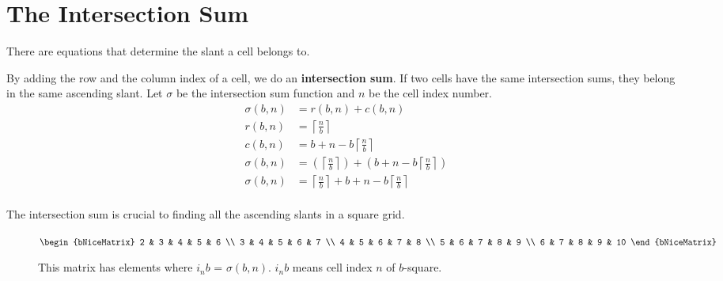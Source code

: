 \documentclass[letterpaper, twoside,12pt]{book}
\begin{document}
    \section{The Intersection Sum} \label{intersection_sum}
    There are equations that determine the slant a cell belongs to.

    By adding the row and the column index of a cell, we do an \textbf{intersection sum}. If two cells have the same intersection sums, they belong in the same ascending slant. Let $\sigma$ be the intersection sum function and $n$ be the cell index number.
    \begin{equation}
        \begin{split}
            \sigma(b,n) &= r(b,n) + c(b,n) \\
            r(b,n) &= \left\lceil \frac{n}{b} \right\rceil \\
            c(b,n) &= b + n - b\left\lceil \frac{n}{b} \right\rceil \\
            \sigma(b,n) &= ( \left\lceil \frac{n}{b} \right\rceil ) + (b + n - b\left\lceil \frac{n}{b} \right\rceil)\\
            \sigma(b,n) &= \left\lceil \frac{n}{b} \right\rceil + b + n - b\left\lceil \frac{n}{b} \right\rceil\\
        \end{split}
    \end{equation}

    The intersection sum is crucial to finding all the ascending slants in a square grid.
    \begin{figure}[ht]
        \centering
        {$
        \begin{bNiceMatrix}
            2 & 3 & 4 & 5 & 6 \\
            3 & 4 & 5 & 6 & 7 \\
            4 & 5 & 6 & 7 & 8 \\
            5 & 6 & 7 & 8 & 9 \\
            6 & 7 & 8 & 9 & 10
        \end{bNiceMatrix}
        $}
        \caption{This matrix has elements where $i_{n}b$ = $\sigma(b,n)$. $i_{n}b$ means cell index $n$ of $b$-square.}
    \end{figure}
\end{document}
